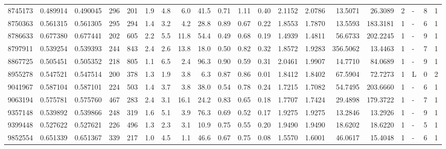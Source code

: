 \begin{center}
\begin{tabular}{rccrrccrrrrrrrrrrlrr}
   8745173 & 0.489914 & 0.490045 &  296 &  201 &      1.9 &      4.8 &     6.0 &    41.5 &   0.71 &   1.11 &       0.40 &  2.1152 &  2.0786 &   13.5071 &   26.3089 &       2 &             - &        8 &         1 \\
   8750363 & 0.561315 & 0.561305 &  295 &  294 &      1.4 &      3.2 &     4.2 &    28.8 &   0.89 &   0.67 &       0.22 &  1.8553 &  1.7870 &   13.5593 &  183.3181 &       1 &             - &        6 &         1 \\
   8786633 & 0.677380 & 0.677441 &  202 &  605 &      2.2 &      5.5 &    11.8 &    54.4 &   0.49 &   0.68 &       0.19 &  1.4939 &  1.4811 &   56.6733 &  202.2245 &       1 &             - &        9 &         1 \\
   8797911 & 0.539254 & 0.539393 &  244 &  843 &      2.4 &      2.6 &    13.8 &    18.0 &   0.50 &   0.82 &       0.32 &  1.8572 &  1.9283 &  356.5062 &   13.4463 &       1 &             - &        7 &         1 \\
   8867725 & 0.505451 & 0.505352 &  218 &  805 &      1.1 &      6.5 &     2.4 &    96.3 &   0.90 &   0.59 &       0.31 &  2.0461 &  1.9907 &   14.7710 &   84.0689 &       1 &             - &        9 &         1 \\
   8955278 & 0.547521 & 0.547514 &  200 &  378 &      1.3 &      1.9 &     3.8 &     6.3 &   0.87 &   0.86 &       0.01 &  1.8412 &  1.8402 &   67.5904 &   72.7273 &       1 &             L &        0 &         2 \\
   9041967 & 0.587104 & 0.587101 &  224 &  503 &      1.4 &      3.7 &     3.8 &    38.0 &   0.54 &   0.78 &       0.24 &  1.7215 &  1.7082 &   54.7495 &  203.6660 &       1 &             - &        6 &         1 \\
   9063194 & 0.575781 & 0.575760 &  467 &  283 &      2.4 &      3.1 &    16.1 &    24.2 &   0.83 &   0.65 &       0.18 &  1.7707 &  1.7424 &   29.4898 &  179.3722 &       1 &             - &        7 &         1 \\
   9357148 & 0.539892 & 0.539866 &  248 &  319 &      1.6 &      5.1 &     3.9 &    76.3 &   0.69 &   0.52 &       0.17 &  1.9275 &  1.9275 &   13.2846 &   13.2926 &       1 &             - &        9 &         1 \\
   9399448 & 0.527622 & 0.527621 &  226 &  496 &      1.3 &      2.3 &     3.1 &    10.9 &   0.75 &   0.55 &       0.20 &  1.9490 &  1.9490 &   18.6202 &   18.6220 &       1 &             - &        5 &         1 \\
   9852554 & 0.651339 & 0.651367 &  339 &  217 &      1.0 &      4.5 &     1.1 &    46.6 &   0.67 &   0.75 &       0.08 &  1.5570 &  1.6001 &   46.0617 &   15.4048 &       1 &             - &        6 &         1 \\

\end{tabular}
\end{center}
